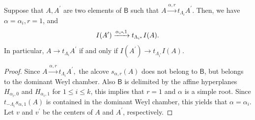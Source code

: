 \documentclass[ALCO,ThmDefs,Unicode,epreuves]{cedram}
\begin{document}
\begin{lemma}
\label{stabilize_with_coeff} Suppose that $A,A^{\prime}$ are two elements of
$\mathsf{B}$ such that $A\xrightarrow{\alpha,r}t_{\Lambda_{i}}A^{\prime}$.
Then, we have $\alpha=\alpha_{i},r=1$, and
\[
I(A^{\prime})\xrightarrow{\alpha_{i^{*}}\mkern-4mu ,1}t_{\Lambda_{i^{\ast}}}I(A).
\]
In particular, $A\rightarrow t_{\Lambda_{i}}A^{\prime}$ if and only if
$I(A^{\prime})\rightarrow t_{\Lambda_{i^{\ast}}}I(A)$.
\end{lemma}

\begin{proof}
Since $A\xrightarrow{\alpha,r}t_{\Lambda_{i}}A^{\prime},$ the alcove
$s_{\alpha,r}(A)$ does not belong to $\mathsf{B}$, but belongs to the dominant
Weyl chamber. Also $\mathsf{B}$ is delimited by the affine hyperplanes
$H_{\alpha_{i},0}$ and $H_{\alpha_{i},1}$ for $1\leq i\leq k$, this implies
that $r=1$ and $\alpha$ is a simple root. Since $t_{-\Lambda_{i}}s_{\alpha
,1}(A)$ is contained in the dominant Weyl chamber, this yields that
$\alpha=\alpha_{i}$. Let $v$ and $v^{\prime}$ be the centers of $A$ and
$A^{\prime}$, respectively.


\end{proof}
\end{document}
